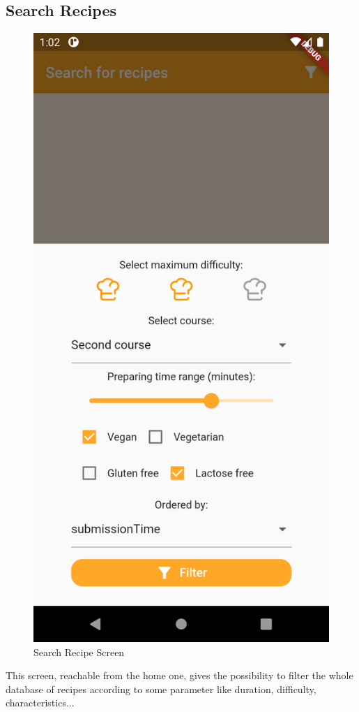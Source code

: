 \subsection{Search Recipes}
\begin{figure}[H]
	\centering
	\includegraphics[width = .225\linewidth]{img/Filter.png}
	\caption{Search Recipe Screen}
\end{figure}
This screen, reachable from the home one, gives the possibility to filter the whole database of recipes according to some parameter like duration, difficulty, characteristics...

